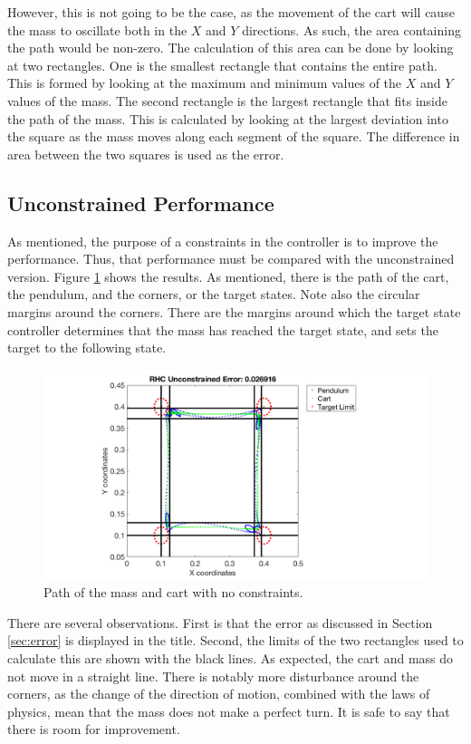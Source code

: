 \documentclass[letterpaper, 10 pt, conference]{ieeeconf} %
\begin{document}
However, this is not going to be the case, as the movement of the cart will cause the mass to oscillate both in the $X$ and $Y$ directions. As such, the area containing the path would be non-zero. The calculation of this area can be done by looking at two rectangles. One is the smallest rectangle that contains the entire path. This is formed by looking at the maximum and minimum values of the $X$ and $Y$ values of the mass. The second rectangle is the largest rectangle that fits inside the path of the mass. This is calculated by looking at the largest deviation into the square as the mass moves along each segment of the square. The difference in area between the two squares is used as the error.

\subsection{Unconstrained Performance}
As mentioned, the purpose of a constraints in the controller is to improve the performance. Thus, that performance must be compared with the unconstrained version. Figure \ref{fig:rhc} shows the results. As mentioned, there is the path of the cart, the pendulum, and the corners, or the target states. Note also the circular margins around the corners. There are the margins around which the target state controller determines that the mass has reached the target state, and sets the target to the following state.

\begin{figure}[!ht]
    \centering
    \includegraphics[width = 1.25\linewidth]{rhc}
    \caption{Path of the mass and cart with no constraints.}
    \label{fig:rhc}
\end{figure}

There are several observations. First is that the error as discussed in Section \ref{sec:error} is displayed in the title. Second, the limits of the two rectangles used to calculate this are shown with the black lines. As expected, the cart and mass do not move in a straight line. There is notably more disturbance around the corners, as the change of the direction of motion, combined with the laws of physics, mean that the mass does not make a perfect turn. It is safe to say that there is room for improvement.
\end{document}
